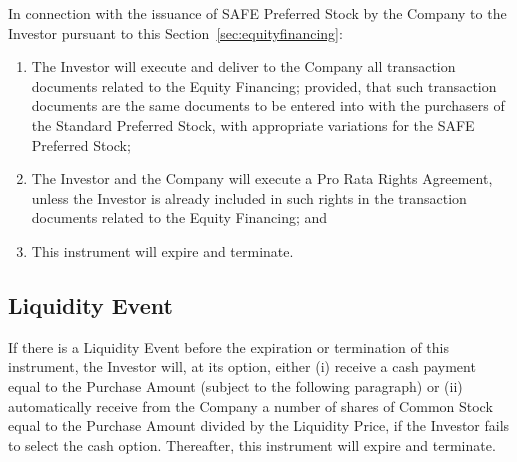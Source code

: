 \documentclass[12pt,letterpaper,fullpage]{article}
\begin{document}
In connection with the issuance of SAFE Preferred Stock by the Company
to the Investor pursuant to this Section~\ref{sec:equityfinancing}:

\begin{enumerate}[label=(\alph*)]

\item {
\begin{sloppypar}
    The Investor will execute and deliver to the Company all
    transaction documents related to the Equity Financing; provided,
    that such transaction documents are the same documents to be
    entered into with the purchasers of the Standard Preferred Stock,
    with appropriate variations for the SAFE Preferred Stock;
\end{sloppypar}}

\item {The Investor and the Company will execute a Pro Rata Rights
    Agreement, unless the Investor is already included in such rights
    in the transaction documents related to the Equity Financing; and}

\item {This instrument will expire and terminate.}

\end{enumerate}

\subsection{Liquidity Event}
\label{sec:liquidityevent}

If there is a Liquidity Event before the expiration or termination of
this instrument, the Investor will, at its option,
either (i) receive a cash payment
equal to the Purchase Amount (subject to the following paragraph)
or (ii) automatically receive from the Company a number of
shares of Common Stock equal to the Purchase Amount divided by the
Liquidity Price, if the Investor fails to select the cash
option. Thereafter, this instrument will expire and
terminate.
\end{document}
